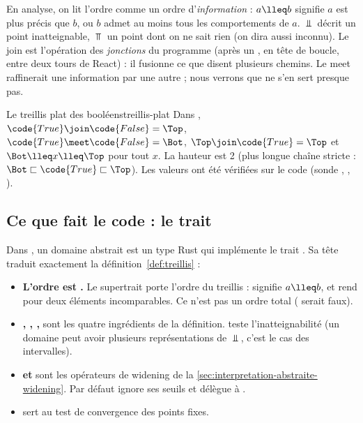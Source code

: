 En analyse, on lit l'ordre comme un ordre d'\emph{information} : $a \lleq b$
signifie \og $a$ est plus précis que $b$\fg{}, ou \og $b$ admet au moins tous
les comportements de $a$\fg{}. $\Bot$ décrit un point inatteignable, $\Top$ un
point dont on ne sait rien (on dira aussi \og inconnu\fg{}). Le join est
l'opération des \emph{jonctions} du programme (après un , en tête de
boucle, entre deux tours de React) : il fusionne ce que disent plusieurs
chemins. Le meet raffinerait une information par une autre ; nous verrons que
\reactant{} ne s'en sert presque pas.

\begin{exemple}{Le treillis plat des booléens}{treillis-plat}
  Dans , $\code{True} \join \code{False} = \Top$,
  $\code{True} \meet \code{False} = \Bot$, $\Top \join \code{True} = \Top$ et
  $\Bot \lleq x \lleq \Top$ pour tout $x$. La hauteur est 2 (plus longue chaîne
  stricte : $\Bot \sqsubset \code{True} \sqsubset \Top$). Les valeurs ont été
  vérifiées sur le code (sonde , ,
  ).
\end{exemple}

\subsection{Ce que fait le code : le trait }

Dans \reactant{}, un domaine abstrait est un type Rust qui implémente le trait
. Sa tête traduit exactement la
définition~\ref{def:treillis} :


\begin{itemize}
  \item \textbf{L'ordre est .} Le supertrait
     porte l'ordre du treillis :  signifie
    $a \lleq b$, et  rend  pour deux éléments
    incomparables. Ce n'est pas un ordre total ( serait faux).
  \item \textbf{, , , } sont les
    quatre ingrédients de la définition.  teste
    l'inatteignabilité (un domaine peut avoir plusieurs représentations de
    $\Bot$, c'est le cas des intervalles).
  \item \textbf{ et } sont les opérateurs de
    widening de la \cref{sec:interpretation-abstraite-widening}. Par défaut
     ignore ses seuils et délègue à .
  \item \textbf{} sert au test de convergence des points
    fixes.
\end{itemize}

